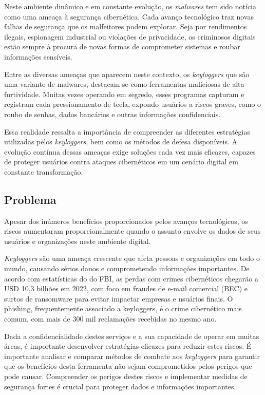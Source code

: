 \documentclass[12pt]{article}
\begin{document}
Neste ambiente dinâmico e em constante evolução, os \textit{malwares} tem sido notícia como uma ameaça à segurança cibernética. Cada avanço tecnológico traz novas falhas de segurança que os malfeitores podem explorar. Seja por rendimentos ilegais, espionagem industrial ou violações de privacidade, os criminosos digitais estão sempre à procura de novas formas de comprometer sistemas e roubar informações sensíveis.

Entre as diversas ameaças que aparecem neste contexto, os \textit{keyloggers} que são uma variante de malwares, destacam-se como ferramentas maliciosas de alta furtividade. Muitas vezes operando em segredo, esses programas capturam e registram cada pressionamento de tecla, expondo usuários a riscos graves, como o roubo de senhas, dados bancários e outras informações confidenciais.

Essa realidade ressalta a importância de compreender as diferentes estratégias utilizadas pelos \textit{keyloggers}, bem como os métodos de defesa disponíveis. A evolução contínua dessas ameaças exige soluções cada vez mais eficazes, capazes de proteger usuários contra ataques cibernéticos em um cenário digital em constante transformação.

\subsection{Problema}


Apesar dos inúmeros benefícios proporcionados pelos avanços tecnológicos, os riscos aumentaram proporcionalmente quando o assunto envolve os dados de seus usuários e organizações neste ambiente digital.

\textit{Keyloggers} são uma ameaça crescente que afeta pessoas e organizações em todo o mundo, causando sérios danos e comprometendo informações importantes. De acordo com estatísticas do \citep{securityintelligence2023} do FBI, as perdas com crimes cibernéticos chegarão a USD 10,3 bilhões em 2022, com foco em fraudes de e-mail comercial (BEC) e surtos de ransomware para evitar impactar empresas e usuários finais. O phishing, frequentemente associado a keyloggers, é o crime cibernético mais comum, com mais de 300 mil reclamações recebidas no mesmo ano.

Dada a confidencialidade destes serviços e a sua capacidade de operar em muitas áreas, é importante desenvolver estratégias eficazes para reduzir estes riscos. É importante analisar e comparar métodos de combate aos \textit{keyloggers} para garantir que os benefícios desta ferramenta não sejam comprometidos pelos perigos que pode causar. Compreender os perigos destes riscos e implementar medidas de segurança fortes é crucial para proteger dados e informações importantes.
\end{document}

